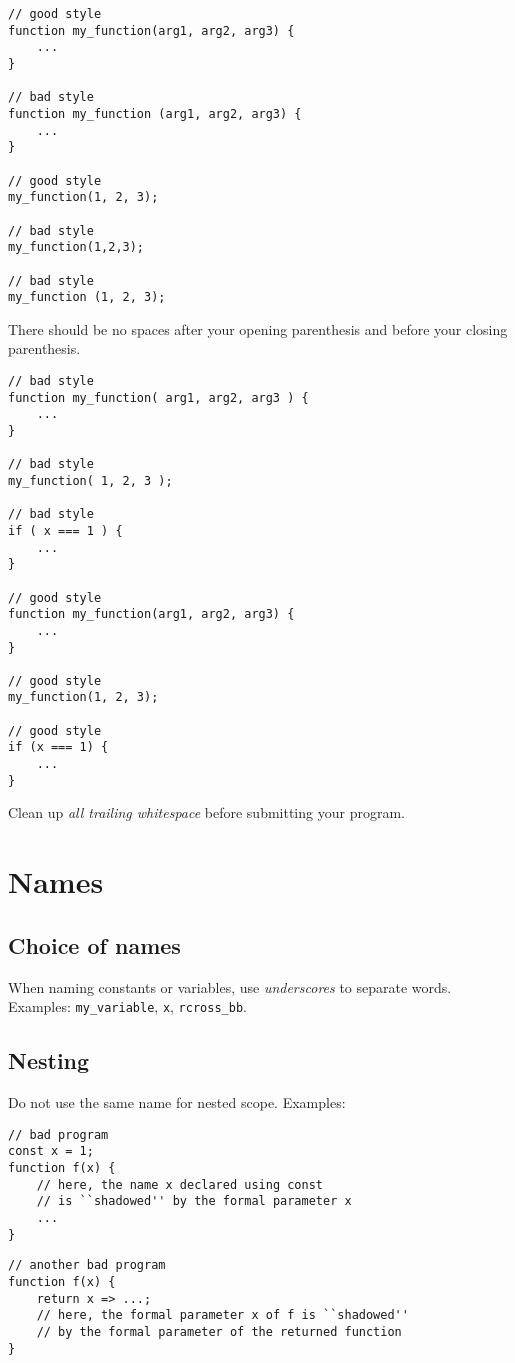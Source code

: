 \begin{lstlisting}
// good style
function my_function(arg1, arg2, arg3) {
    ...
}

// bad style
function my_function (arg1, arg2, arg3) {
    ...
}

// good style
my_function(1, 2, 3);

// bad style
my_function(1,2,3);

// bad style
my_function (1, 2, 3);
\end{lstlisting}

  There should be no spaces after your opening parenthesis and before your closing parenthesis.
  
\begin{lstlisting}
// bad style
function my_function( arg1, arg2, arg3 ) {
    ...
}

// bad style
my_function( 1, 2, 3 );

// bad style
if ( x === 1 ) {
    ...
}

// good style
function my_function(arg1, arg2, arg3) {
    ...
}

// good style
my_function(1, 2, 3);

// good style
if (x === 1) {
    ...
}
\end{lstlisting}

  Clean up \emph{all trailing whitespace} before submitting your program.

\section*{Names}
\subsection*{Choice of names}
When naming constants or variables,
use \emph{underscores} to separate words.
Examples: \lstinline{my_variable}, \lstinline{x}, \lstinline{rcross_bb}.

\subsection*{Nesting}
Do not use the same name for nested scope. Examples:
\begin{lstlisting}
// bad program
const x = 1;
function f(x) {
    // here, the name x declared using const
    // is ``shadowed'' by the formal parameter x
    ...
}
\end{lstlisting}

\begin{lstlisting}
// another bad program
function f(x) {
    return x => ...;
    // here, the formal parameter x of f is ``shadowed'' 
    // by the formal parameter of the returned function
}
\end{lstlisting}

